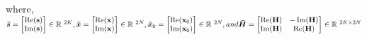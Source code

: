 \documentclass[conference]{IEEEtran}
\begin{document}

where, $ \boldsymbol{\bar{s}} = 
  \begin{bmatrix}
    \mathop{\mathrm{Re}}({\mathbf{s}})\\ 
    \mathop{\mathrm{Im}}({\mathbf{s}})
  \end{bmatrix} \in \mathbb{R}\ ^{{2K}},
\boldsymbol{\bar{x}} = 
  \begin{bmatrix}
    \mathop{\mathrm{Re}}({\mathbf{x}})\\ 
    \mathop{\mathrm{Im}}({\mathbf{x}})
  \end{bmatrix} \in \mathbb{R}\ ^{{2N}},
\boldsymbol{\bar{x}}_{0} = 
  \begin{bmatrix}
    \mathop{\mathrm{Re}}({\mathbf{x}}_{0})\\ 
    \mathop{\mathrm{Im}}({\mathbf{x}}_{0})
  \end{bmatrix} \in \mathbb{R}\ ^{{2N}},  and
\boldsymbol{\bar{H}} = 
  \begin{bmatrix}
    \mathop{\mathrm{Re}}({\mathbf{H}}) & -\mathop{\mathrm{Im}}({\mathbf{H}})\\ 
    \mathop{\mathrm{Im}}({\mathbf{H}}) & \mathop{\mathrm{Re}}({\mathbf{H}})
  \end{bmatrix} \in \mathbb{R}\ ^{{2K}\times{2N}} $

\end{document}
